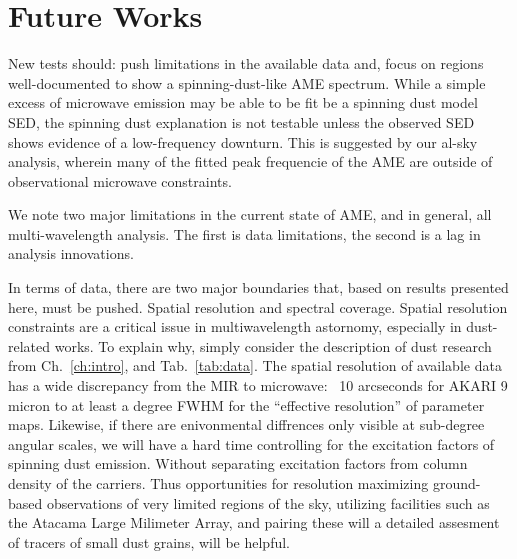 \section{Future Works}
  New tests should: push limitations in the available data and, focus on regions well-documented to show a spinning-dust-like AME spectrum. While a simple excess of microwave emission may be able to be fit be a spinning dust model SED, the spinning dust explanation is not testable unless the observed SED shows evidence of a low-frequency downturn. This is suggested by our al-sky analysis, wherein many of the fitted peak frequencie of the AME are outside of observational microwave constraints.

  We note two major limitations in the current state of AME, and in general, all multi-wavelength analysis.
  The first is data limitations, the second is a lag in analysis innovations.

  In terms of data, there are two major boundaries that, based on results presented here, must be pushed. Spatial resolution and spectral coverage.
  Spatial resolution constraints are a critical issue in multiwavelength astornomy, especially in dust-related works. To explain why, simply consider the description of dust research from Ch.~\ref{ch:intro}, and Tab.~\ref{tab:data}. The spatial resolution of available data has a wide discrepancy from the MIR to microwave: ~10 arcseconds for AKARI 9 micron to at least a degree FWHM for the ``effective resolution'' of parameter maps. Likewise, if there are enivonmental diffrences only visible at sub-degree angular scales, we will have a hard time controlling for the excitation factors of spinning dust emission. Without separating excitation factors from column density of the carriers. Thus opportunities for resolution maximizing ground-based observations of very limited regions of the sky, utilizing facilities such as the Atacama Large Milimeter Array, and pairing these will a detailed assesment of tracers of small dust grains, will be helpful.

